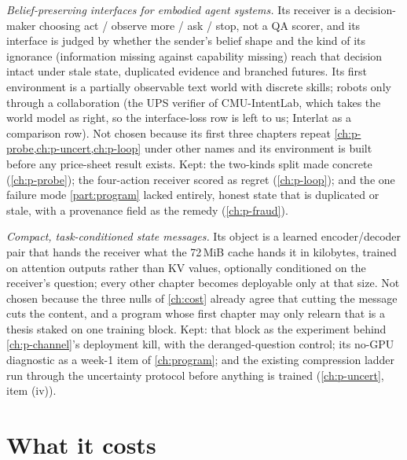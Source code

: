 \documentclass[11pt,a4paper]{report}
\begin{document}
\emph{Belief-preserving interfaces for embodied agent systems.} Its receiver is a decision-maker choosing act / observe more / ask / stop, not a QA scorer, and its interface is judged by whether the sender's belief shape and the kind of its ignorance (information missing against capability missing) reach that decision intact under stale state, duplicated evidence and branched futures. Its first environment is a partially observable text world with discrete skills; robots only through a collaboration (the UPS verifier of CMU-IntentLab, which takes the world model as right, so the interface-loss row is left to us; Interlat as a comparison row). Not chosen because its first three chapters repeat \cref{ch:p-probe,ch:p-uncert,ch:p-loop} under other names and its environment is built before any price-sheet result exists. Kept: the two-kinds split made concrete (\cref{ch:p-probe}); the four-action receiver scored as regret (\cref{ch:p-loop}); and the one failure mode \cref{part:program} lacked entirely, honest state that is duplicated or stale, with a provenance field as the remedy (\cref{ch:p-fraud}).

\emph{Compact, task-conditioned state messages.} Its object is a learned encoder/decoder pair that hands the receiver what the 72\,MiB cache hands it in kilobytes, trained on attention outputs rather than KV values, optionally conditioned on the receiver's question; every other chapter becomes deployable only at that size. Not chosen because the three nulls of \cref{ch:cost} already agree that cutting the message cuts the content, and a program whose first chapter may only relearn that is a thesis staked on one training block. Kept: that block as the experiment behind \cref{ch:p-channel}'s deployment kill, with the deranged-question control; its no-GPU diagnostic as a week-1 item of \cref{ch:program}; and the existing compression ladder run through the uncertainty protocol before anything is trained (\cref{ch:p-uncert}, item (iv)).

\section{What it costs}
\end{document}
